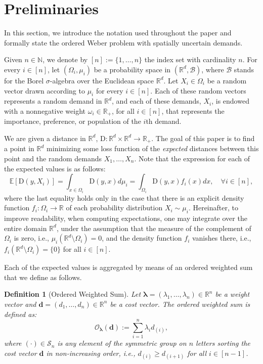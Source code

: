 \documentclass[letter,11pt, reqno]{amsart}
\newcommand{\R}{\mathbb{R}}
\newcommand{\N}{\mathbb{N}}
\newcommand{\D}{\mathrm{D}}
\newcommand{\BB}{\mathcal{B}}
\renewcommand{\O}{\mathcal{O}}
\newcommand{\dsum}{\displaystyle\sum}
\renewcommand{\;}{\quad}
\theoremstyle{thmstyleone}%
\theoremstyle{thmstyletwo}%
\theoremstyle{thmstylethree}%
\newtheorem{definition}{Definition}%
\begin{document}
\section{Preliminaries}  \label{sec:problem}
In this section, we introduce the notation used throughout the paper and formally state the ordered Weber problem with spatially uncertain demands.

Given $n\in \N$, we denote by $[n]:=\{1,\ldots,n\}$ the index set with cardinality $n$. For every $i \in [n]$, let $(\Omega_i, \mu_i)$ be a probability space in $(\R^d, \BB)$, where $\BB$ stands for the Borel $\sigma$-algebra over the Euclidean space $\R^d$. Let $X_i\in \Omega_i$ be a random vector drawn according to $\mu_i$ for every $i\in [n]$. Each of these random vectors represents a random demand in $\R^d$, and each of these demands, $X_i$, is endowed with a nonnegative weight $\omega_i\in \R_+$, for all $i \in [n]$, that represents the importance, preference, or population of the $i$th demand.

We are given a distance in $\R^d$, $\D: \R^d \times \R^d \rightarrow \R_+$. The goal of this paper is to find a point in $\R^d$ minimizing some loss function of the \emph{expected} distances between this point and the random demands $X_1, \ldots, X_n$. Note that the expression for each of the expected values is as follows:
\begin{equation*}
    \mathbb{E}\left[\D(y,X_i)\right] = \int_{x \in \Omega_i} \D(y,x) d\mu_i = \int_{\Omega_i} \D(y,x) f_i(x) dx, \quad \forall i \in [n],
\end{equation*}
where the last equality holds only in the case that there is an explicit density function $f_i: \Omega_i \to \R$ of each probability distribution $X_i\sim \mu_i$. Hereinafter, to improve readability, when computing expectations, one may integrate over the entire domain $\R^d$, under the assumption that the measure of the complement of $\Omega_i$ is zero, i.e., $\mu_i(\R^d \setminus \Omega_i) = 0$, and the density function $f_i$ vanishes there, i.e., $f_i(\R^d\setminus \Omega_i)=\{0\}$ for all $i\in [n]$.

Each of the expected values is aggregated by means of an ordered weighted sum that we define as follows.
\begin{definition}[Ordered Weighted Sum]
    Let $\bm{\lambda} = (\lambda_1, \ldots, \lambda_n)\in \R^n$ be a weight vector and $\bm{d}=(d_1,\ldots, d_n)\in \R^n$ be a cost vector. The \emph{ordered weighted sum} is defined as:
\begin{equation*}
    \O_{\bm{\lambda}}(\bm{d}):=\dsum_{i=1}^n\lambda_i d_{(i)},
\end{equation*}
where $(\cdot)\in \mathscr{S}_n$ is any element of the symmetric group on $n$ letters sorting the cost vector $\bm{d}$ in non-increasing order, i.e., $d_{(i)}\geq d_{(i+1)}$ for all $i\in [n-1]$.
\end{definition}
\end{document}
